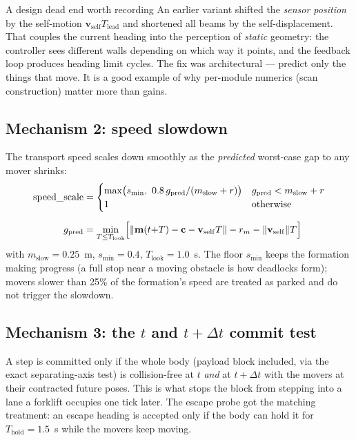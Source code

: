 \begin{keybox}{A design dead end worth recording}
An earlier variant shifted the \emph{sensor position} by the self-motion
$\mathbf{v}_{\mathrm{self}} T_{\mathrm{lead}}$ and shortened all beams by the
self-displacement. That couples the current heading into the perception of
\emph{static} geometry: the controller sees different walls depending on which
way it points, and the feedback loop produces heading limit cycles. The fix
was architectural --- predict only the things that move. It is a good example
of why per-module numerics (scan construction) matter more than gains.
\end{keybox}

\subsection{Mechanism 2: speed slowdown}

The transport speed scales down smoothly as the \emph{predicted} worst-case
gap to any mover shrinks:
%
\begin{align*}
\text{speed\_scale} &=
\begin{cases}
\max\bigl(s_{\min},\ 0.8\, g_{\mathrm{pred}} / (m_{\mathrm{slow}} + r)\bigr)
& g_{\mathrm{pred}} < m_{\mathrm{slow}} + r\\
1 & \text{otherwise}
\end{cases}\\[6pt]
g_{\mathrm{pred}} &= \min_{T \le T_{\mathrm{look}}}
\Bigl[ \lVert \mathbf{m}(t{+}T) - \mathbf{c} - \mathbf{v}_{\mathrm{self}} T \rVert
- r_m - \lVert \mathbf{v}_{\mathrm{self}}\rVert T \Bigr]
\end{align*}
%
with $m_{\mathrm{slow}} = 0.25$~m, $s_{\min} = 0.4$, $T_{\mathrm{look}} =
1.0$~s. The floor $s_{\min}$ keeps the formation making progress (a full stop
near a moving obstacle is how deadlocks form); movers slower than 25\% of the
formation's speed are treated as parked and do not trigger the slowdown.

\subsection{Mechanism 3: the $t$ and $t{+}\Delta t$ commit test}

A step is committed only if the whole body (payload block included, via the
exact separating-axis test) is collision-free at $t$ \emph{and} at
$t + \Delta t$ with the movers at their contracted future poses. This is what
stops the block from stepping into a lane a forklift occupies one tick later.
The escape probe got the matching treatment: an escape heading is accepted
only if the body can hold it for $T_{\mathrm{hold}} = 1.5$~s while the movers
keep moving.

